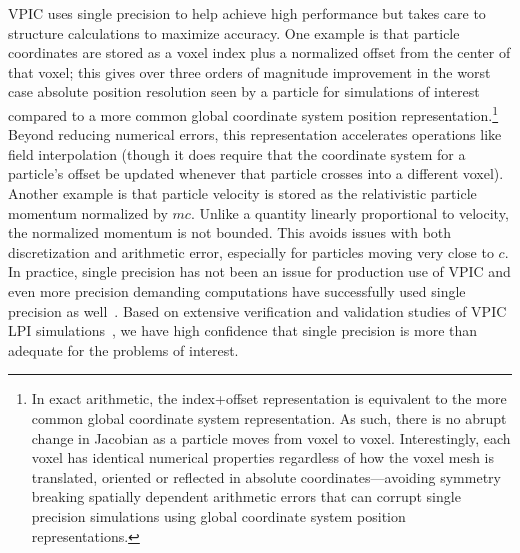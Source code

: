 \documentclass[journal,twoside]{IEEEtran}
\begin{document}
VPIC uses single precision to help achieve high performance but takes
care to structure calculations to maximize accuracy.  One example is
that particle coordinates are stored as a voxel index plus a
normalized offset from the center of that voxel; this gives over three
orders of magnitude improvement in the worst case absolute position
resolution seen by a particle for simulations of interest compared to
a more common global coordinate system position
representation.\footnote{In exact arithmetic, the index+offset
representation is equivalent to the more common global coordinate
system representation.  As such, there is no abrupt change in Jacobian
as a particle moves from voxel to voxel.  Interestingly, each voxel
has identical numerical properties regardless of how the voxel mesh is
translated, oriented or reflected in absolute coordinates---avoiding
symmetry breaking spatially dependent arithmetic errors that can
corrupt single precision simulations using global coordinate system
position representations.}  Beyond reducing numerical errors, this
representation accelerates operations like field interpolation (though
it does require that the coordinate system for a particle's offset be
updated whenever that particle crosses into a different voxel).
Another example is that particle velocity is stored as the
relativistic particle momentum normalized by $mc$.  Unlike a quantity
linearly proportional to velocity, the normalized momentum is not
bounded.  This avoids issues with both discretization and arithmetic
error, especially for particles moving very close to $c$.  In
practice, single precision has not been an issue for production use of
VPIC and even more precision demanding computations have successfully
used single precision as
well~\cite{Bowers_et_al_2006,Langou_et_al_2006,Lippert_et_al_2007}.
Based on extensive verification and validation studies of VPIC LPI
simulations~\cite{Yin_et_al_Phys_Plasmas_2006}, we have high
confidence that single precision is more than adequate for the
problems of interest.
\end{document}

